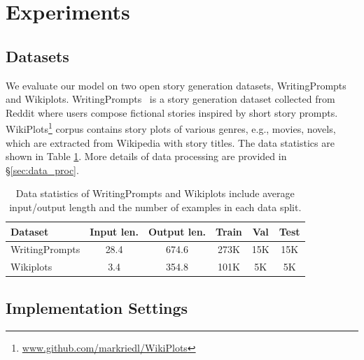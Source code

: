 \documentclass[11pt]{article}
\begin{document}
\section{Experiments}

\subsection{Datasets}

We evaluate our model on two open story generation datasets, WritingPrompts and Wikiplots. WritingPrompts~\citep{DBLP:conf/acl/LewisDF18} is a story generation dataset collected from Reddit where users compose fictional stories inspired by short story prompts. WikiPlots\footnote{\url{www.github.com/markriedl/WikiPlots}} corpus contains story plots of various genres, e.g., movies, novels, which are extracted from Wikipedia with story titles. The data statistics are shown in Table \ref{tab:stats}. More details of data processing are provided in \S{\ref{sec:data_proc}}.

\begin{table}[t!]
    \centering
    \scriptsize	
    \begin{tabular}{l|c|c|ccc}
    \toprule[1pt]
         Dataset & Input len. & Output len. & Train & Val & Test\\
    \midrule[0.5pt]
    WritingPrompts & 28.4 & 674.6 & 273K & 15K & 15K\\
    Wikiplots & 3.4 & 354.8 & 101K & 5K & 5K\\
    \bottomrule[1pt]
    \end{tabular}
    \caption{Data statistics of WritingPrompts and Wikiplots include average input/output length and the number of examples in each data split.}
    \label{tab:stats}
\end{table}



\subsection{Implementation Settings}
\end{document}
